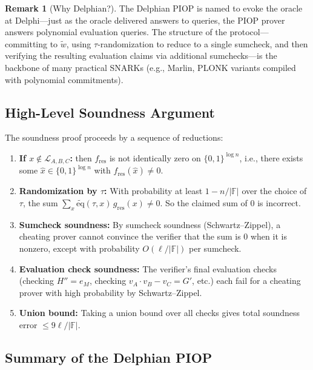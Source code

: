 \documentclass[11pt]{article}
\theoremstyle{plain}
\theoremstyle{definition}
\newtheorem{remark}[theorem]{Remark}
\newcommand{\F}{\mathbb{F}}
\begin{document}
\begin{remark}[Why Delphian?]
  The Delphian PIOP is named to evoke the oracle at Delphi---just as the oracle
  delivered answers to queries, the PIOP prover answers polynomial evaluation
  queries. The structure of the protocol---committing to $\tilde{w}$, using
  $\tau$-randomization to reduce to a single sumcheck, and then verifying the
  resulting evaluation claims via additional sumchecks---is the backbone of many
  practical SNARKs (e.g., Marlin, PLONK variants compiled with polynomial
  commitments).
\end{remark}

\subsection{High-Level Soundness Argument}

The soundness proof proceeds by a sequence of reductions:

\begin{enumerate}
  \item \textbf{If $x \notin \mathcal{L}_{A,B,C}$:} then $f_{\mathrm{res}}$
    is not identically zero on $\{0,1\}^{\log n}$, i.e., there exists some
    $\hat{x} \in \{0,1\}^{\log n}$ with $f_{\mathrm{res}}(\hat{x}) \neq 0$.

  \item \textbf{Randomization by $\tau$:} With probability at least
    $1 - n/|\F|$ over the choice of $\tau$, the sum
    $\sum_{x} \widetilde{\mathrm{eq}}(\tau, x)\, g_{\mathrm{res}}(x) \neq 0$.
    So the claimed sum of 0 is incorrect.

  \item \textbf{Sumcheck soundness:} By sumcheck soundness (Schwartz--Zippel),
    a cheating prover cannot convince the verifier that the sum is 0 when it
    is nonzero, except with probability $O(\ell/|\F|)$ per sumcheck.

  \item \textbf{Evaluation check soundness:} The verifier's final evaluation
    checks (checking $H'' = e_M$, checking $v_A \cdot v_B - v_C = G'$, etc.)
    each fail for a cheating prover with high probability by Schwartz--Zippel.

  \item \textbf{Union bound:} Taking a union bound over all checks gives total
    soundness error $\leq 9\ell / |\F|$.
\end{enumerate}

\subsection{Summary of the Delphian PIOP}
\end{document}
